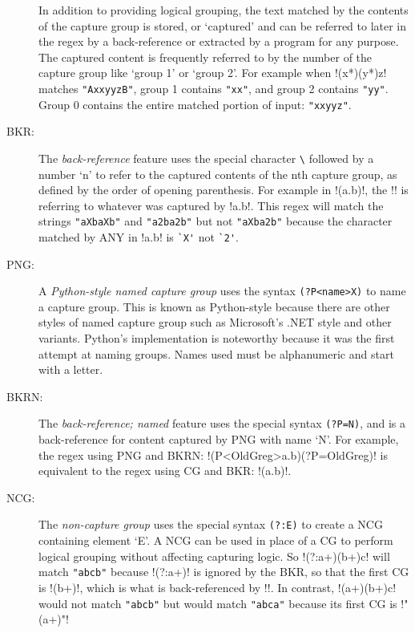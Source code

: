 \begin{description}
In addition to providing logical grouping, the text matched by the contents of the capture group is stored, or `captured' and can be referred to later in the regex by a back-reference or extracted by a program for any purpose.  The captured content is frequently referred to by the number of the capture group like `group 1' or `group 2'.  For example when \cverb!(x*)(y*)z! matches \verb!"AxxyyzB"!, group 1 contains \verb!"xx"!, and group 2 contains  \verb!"yy"!.  Group 0 contains the entire matched portion of input: \verb!"xxyyz"!.
\item[BKR:] The \emph{back-reference} feature uses the special character \verb!\! followed by a number `n' to refer to the captured contents of the nth capture group, as defined by the order of opening parenthesis.  For example in \cverb!(a.b)\1!, the \cverb!\1! is referring to whatever was captured by \cverb!a.b!.  This regex will match the strings \verb!"aXbaXb"! and \verb!"a2ba2b"! but not \verb!"aXba2b"! because the character matched by ANY in \cverb!a.b! is \verb!`X'! not \verb!`2'!.
\item[PNG:] A \emph{Python-style named capture group} uses the syntax \verb!(?P<name>X)! to name a capture group.  This is known as Python-style because there are other styles of named capture group such as Microsoft's .NET style and other variants.  Python's implementation is noteworthy because it was the first attempt at naming groups.  Names used must be alphanumeric and start with a letter.
\item[BKRN:] The \emph{back-reference; named} feature uses the special syntax \verb!(?P=N)!, and is a back-reference for content captured by PNG with name `N'.  For example, the regex using PNG and BKRN: \cverb!(P<OldGreg>a.b)(?P=OldGreg)! is equivalent to the regex using CG and BKR: \cverb!(a.b)\1!.
\item[NCG:] The \emph{non-capture group} uses the special syntax \verb!(?:E)! to create a NCG containing element `E'.  A NCG can be used in place of a CG to perform logical grouping without affecting capturing logic.  So \cverb!(?:a+)(b+)c\1! will match \verb!"abcb"! because \cverb!(?:a+)! is ignored by the BKR, so that the first CG is \cverb!(b+)!, which is what is back-referenced by \cverb!\1!.  In contrast, \cverb!(a+)(b+)c\1! would not match \verb!"abcb"! but would match \verb!"abca"! because its first CG is \cverb!"(a+)"!
\end{description}

